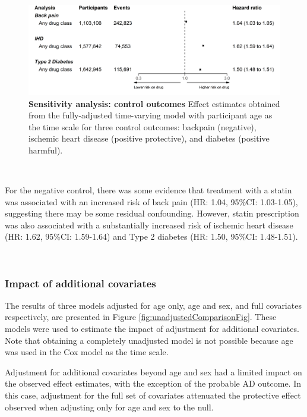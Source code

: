 \documentclass[a4paper, twoside]{templates/ociamthesis}
\begin{document}
\begin{figure}[H]
\includegraphics[width=1\linewidth]{figures/cprd-analysis/forester_control_outcomes} \caption[Sensitivity analysis: control outcomes]{\textbf{Sensitivity analysis: control outcomes} Effect estimates obtained from the fully-adjusted time-varying model with participant age as the time scale for three control outcomes: backpain (negative), ischemic heart disease (positive protective), and diabetes (positive harmful).}\label{fig:controlOutcomeFig}
\end{figure}

~

For the negative control, there was some evidence that treatment with a statin was associated with an increased risk of back pain (HR: 1.04, 95\%CI: 1.03-1.05), suggesting there may be some residual confounding. However, statin prescription was also associated with a substantially increased risk of ischemic heart disease (HR: 1.62, 95\%CI: 1.59-1.64) and Type 2 diabetes (HR: 1.50, 95\%CI: 1.48-1.51).

~

\hypertarget{cprd-impact-additional-covar}{%
\subsubsection{Impact of additional covariates}\label{cprd-impact-additional-covar}}

The results of three models adjusted for age only, age and sex, and full covariates respectively, are presented in Figure \ref{fig:unadjustedComparisonFig}. These models were used to estimate the impact of adjustment for additional covariates. Note that obtaining a completely unadjusted model is not possible because age was used in the Cox model as the time scale.

Adjustment for additional covariates beyond age and sex had a limited impact on the observed effect estimates, with the exception of the probable AD outcome. In this case, adjustment for the full set of covariates attenuated the protective effect observed when adjusting only for age and sex to the null.
\end{document}
